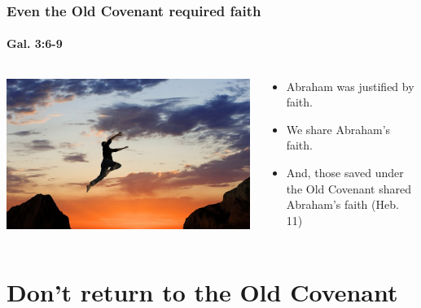 \begin{frame}
\frametitle{Even the Old Covenant required faith}
\framesubtitle{Gal. 3:6-9}
\begin{columns}[T]
\begin{column}{0.5\textwidth}
	\begin{center}
	\includegraphics[width=\columnwidth]{figures/faith.jpg}\\
	\end{center}
\end{column}
\begin{column}{0.5\textwidth}
	\begin{itemize}
		\item Abraham was justified by faith.
		\item We share Abraham's faith.
		\item And, those saved under the Old Covenant shared Abraham's faith (Heb. 11)
	\end{itemize}
\end{column}
\end{columns}

\end{frame}

\section{Don't return to the Old Covenant}

